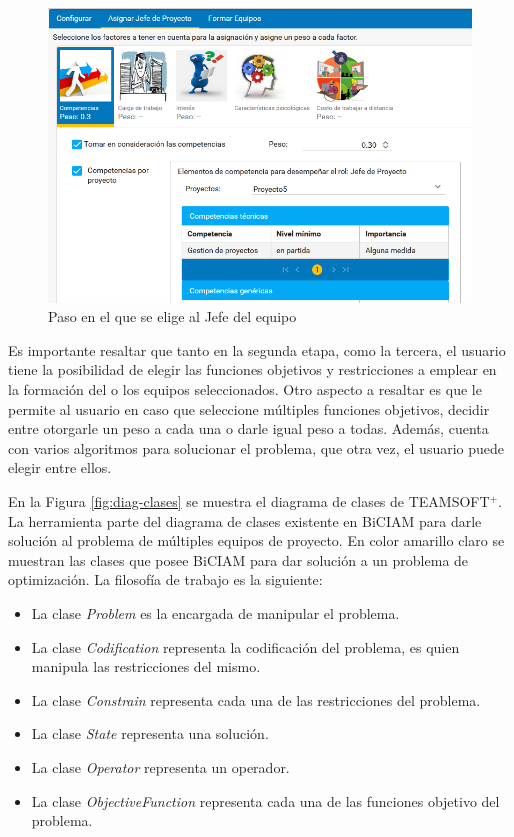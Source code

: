 \begin{figure}[H]
	\centering
	\includegraphics[width=\textwidth]{figuras/conformacion_equipos_asignar_jefe.png}
	\caption{Paso en el que se elige al Jefe del equipo}\label{fig:conf_equip_teamsoft}
\end{figure}

{\color{red}
	Es importante resaltar que tanto en la segunda etapa, como la tercera, el usuario tiene la posibilidad de elegir las funciones objetivos y restricciones a emplear en la formación del o los equipos seleccionados. Otro aspecto a resaltar es que le permite al usuario en caso que seleccione múltiples funciones objetivos, decidir entre otorgarle un peso a cada una o darle igual peso a todas. Además, cuenta con varios algoritmos para solucionar el problema, que otra vez, el usuario puede elegir entre ellos.\\
}

En la Figura \ref{fig:diag-clases} se muestra el diagrama de clases de TEAMSOFT$^+$. La herramienta parte del diagrama de clases existente en BiCIAM para darle solución al problema de múltiples equipos de proyecto. En color amarillo claro se muestran las clases que posee BiCIAM para dar solución a un problema de optimización. La filosofía de trabajo es la siguiente:
\begin{itemize}
	\item La clase \textit{Problem} es la encargada de manipular el problema.
	\item La clase \textit{Codification} representa la codificación del problema, es quien manipula las restricciones del mismo.
	\item La clase \textit{Constrain} representa cada una de las restricciones del problema.
	\item La clase \textit{State} representa una solución.
	\item La clase \textit{Operator} representa un operador.
	\item La clase \textit{ObjectiveFunction} representa cada una de las funciones objetivo del problema.
\end{itemize}

